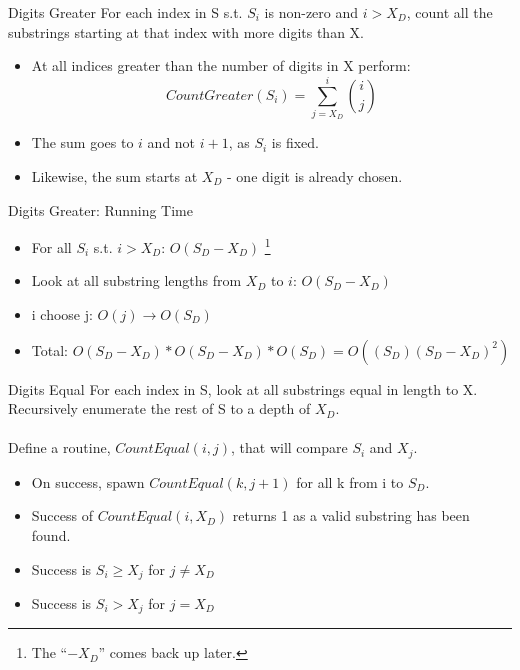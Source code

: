 \documentclass[10pt]{beamer}
\begin{document}
\begin{frame}{Digits Greater}
  \large
  For each index in S s.t. $S_{i}$ is non-zero and $i > X_{D}$, count all the substrings starting at that index with more digits than X.
  \begin{itemize} %
    \item At all indices greater than the number of digits in X perform:
      \begin{equation*}
        CountGreater(S_{i}) = \sum_{j = X_{D}}^{i} \binom{i}{j}
      \end{equation*}
    \item The sum goes to $i$ and not $i + 1$, as $S_{i}$ is fixed.
    \item Likewise, the sum starts at $X_{D}$ \-- one digit is already chosen.
  \end{itemize}
\end{frame}

\begin{frame}{Digits Greater: Running Time}
  \large
  \begin{itemize} %
    \item For all $S_{i}$ s.t. $i > X_{D}$: $O(S_D - X_D)$ \footnote{The ``$- X_D$'' comes back up later.}
    \item Look at all substring lengths from $X_D$ to $i$: $O(S_D - X_D)$
    \item i choose j: $O(j) \rightarrow O(S_D)$
    \item Total: $O(S_D - X_D)*O(S_D - X_D)*O(S_D) = O((S_{D})(S_{D} - X_D)^{2})$
  \end{itemize}
\end{frame}

\begin{frame}{Digits Equal}
  \large
  For each index in S, look at all substrings equal in length to X.
  Recursively enumerate the rest of S to a depth of $X_{D}$. \\ \\
  Define a routine, $CountEqual(i,j)$, that will compare $S_{i}$ and $X_{j}$.
  \begin{itemize}
    \item On success, spawn $CountEqual(k, j + 1)$ for all k from i to $S_{D}$.
    \item Success of $CountEqual(i, X_{D})$ returns 1 as a valid substring has been found.
    \item Success is $S_{i} \ge X_{j}$ for $j \ne X_{D}$
    \item Success is $S_{i} > X_{j}$ for $j = X_{D}$
  \end{itemize}
\end{frame}
\end{document}

